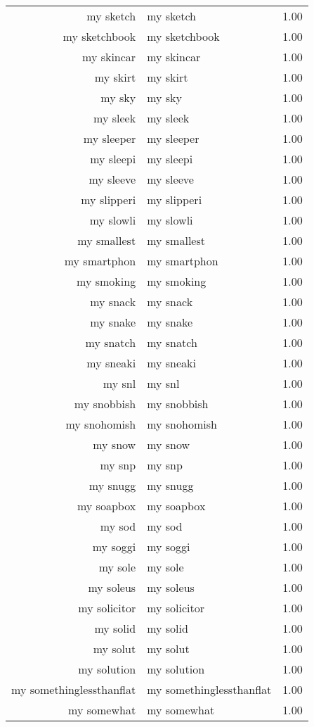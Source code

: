 \begin{table}[ht]
\begin{tabular}{rlr}
  my sketch & my sketch & 1.00 \\ 
  my sketchbook & my sketchbook & 1.00 \\ 
  my skincar & my skincar & 1.00 \\ 
  my skirt & my skirt & 1.00 \\ 
  my sky & my sky & 1.00 \\ 
  my sleek & my sleek & 1.00 \\ 
  my sleeper & my sleeper & 1.00 \\ 
  my sleepi & my sleepi & 1.00 \\ 
  my sleeve & my sleeve & 1.00 \\ 
  my slipperi & my slipperi & 1.00 \\ 
  my slowli & my slowli & 1.00 \\ 
  my smallest & my smallest & 1.00 \\ 
  my smartphon & my smartphon & 1.00 \\ 
  my smoking & my smoking & 1.00 \\ 
  my snack & my snack & 1.00 \\ 
  my snake & my snake & 1.00 \\ 
  my snatch & my snatch & 1.00 \\ 
  my sneaki & my sneaki & 1.00 \\ 
  my snl & my snl & 1.00 \\ 
  my snobbish & my snobbish & 1.00 \\ 
  my snohomish & my snohomish & 1.00 \\ 
  my snow & my snow & 1.00 \\ 
  my snp & my snp & 1.00 \\ 
  my snugg & my snugg & 1.00 \\ 
  my soapbox & my soapbox & 1.00 \\ 
  my sod & my sod & 1.00 \\ 
  my soggi & my soggi & 1.00 \\ 
  my sole & my sole & 1.00 \\ 
  my soleus & my soleus & 1.00 \\ 
  my solicitor & my solicitor & 1.00 \\ 
  my solid & my solid & 1.00 \\ 
  my solut & my solut & 1.00 \\ 
  my solution & my solution & 1.00 \\ 
  my somethinglessthanflat & my somethinglessthanflat & 1.00 \\ 
  my somewhat & my somewhat & 1.00 \\ 

\end{tabular}
\end{table}
